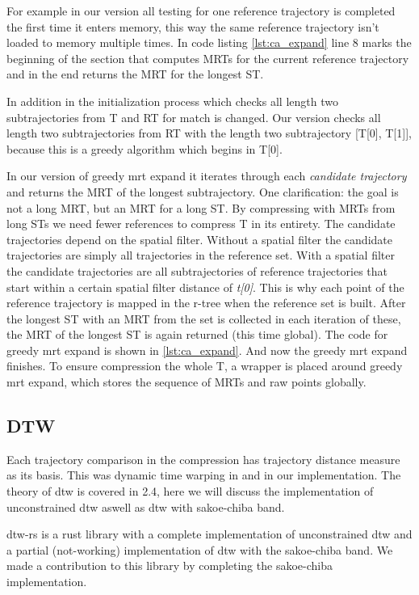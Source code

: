 For example in our version all testing for one reference trajectory is completed the first time it enters memory, this way the same reference trajectory isn't loaded to memory multiple times. In code listing \ref{lst:ca_expand} line 8 marks the beginning of the section that computes MRTs for the current reference trajectory and in the end returns the MRT for the longest ST.

In addition in the initialization process which checks all length two subtrajectories from T and RT for match is changed. Our version checks all length two subtrajectories from RT with the length two subtrajectory [T[0], T[1]], because this is a greedy algorithm which begins in T[0].

In our version of greedy mrt expand it iterates through each \textit{candidate trajectory} and returns the MRT of the longest subtrajectory. One clarification: the goal is not a long MRT, but an MRT for a long ST. By compressing with MRTs from long STs we need fewer references to compress T in its entirety. The candidate trajectories depend on the spatial filter. Without a spatial filter the candidate trajectories are simply all trajectories in the reference set. With a spatial filter the candidate trajectories are all subtrajectories of reference trajectories that start within a certain spatial filter distance of \textit{t[0]}. This is why each point of the reference trajectory is mapped in the r-tree when the reference set is built. After the longest ST with an MRT from the set is collected in each iteration of these, the MRT of the longest ST is again returned (this time global). The code for greedy mrt expand is shown in \ref{lst:ca_expand}. And now the greedy mrt expand finishes. To ensure compression the whole T, a wrapper is placed around greedy mrt expand, which stores the sequence of MRTs and raw points globally.


\subsection{DTW}
Each trajectory comparison in the compression has trajectory distance measure as its basis. This was dynamic time warping in \cite{zhao2018rest} and in our implementation. The theory of dtw is covered in 2.4, here we will discuss the implementation of unconstrained dtw aswell as dtw with sakoe-chiba band.

dtw-rs is a rust library with a complete implementation of unconstrained dtw and a partial (not-working) implementation of dtw with the sakoe-chiba band. We made a contribution to this library by completing the sakoe-chiba implementation.